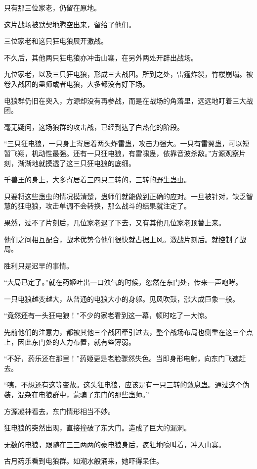 \begin{this_body}
只有那三位家老，仍留在原地。

这片战场被默契地腾空出来，留给了他们。

三位家老和这只狂电狼展开激战。

不久后，其他两只狂电狼亦冲击山寨，在另外两处开辟出战场。

九位家老，以及三只狂电狼，形成三大战团。所到之处，雷霆炸裂，竹楼崩塌。被卷入战团的蛊师或者电狼，大多都没有好下场。

电狼群仍旧在突入，方源却没有再参战，而是在战场的角落里，远远地盯着三大战团。

毫无疑问，这场狼群的攻击战，已经到达了白热化的阶段。

“三只狂电狼，一只身上寄居着两头炸雷蛊，攻击力强大。一只有雷翼蛊，可以短暂飞翔，机动性最强。还有一只狂电狼，有雷啸蛊，依靠音波杀敌。”方源观察片刻，渐渐地就摸透了这三只狂电狼的底细。

千兽王的身上，大多寄居着三四只二转的，三转的野生蛊虫。

只要将这些蛊虫的情况摸清楚，蛊师们就能做到正确的应对。一旦被针对，缺乏智慧的狂电狼，攻击单调不会转换，那么战斗的结果就注定了。

果然，过不了片刻后，几位家老退了下去，又有其他几位家老顶替上来。

他们之间相互配合，战术优势令他们很快就占据上风。激战片刻后。就控制了战局。

胜利只是迟早的事情。

“大局已定了。”就在药姬吐出一口浊气的时候，忽然在东门处，传来一声咆哮。

一只电狼越变越大，从普通的电狼大小的身躯。见风吹鼓，涨大成巨象一般。

“竟然还有一头狂电狼！”不少的家老看到这一幕，顿时吃了一大惊。

先前他们的注意力，都被其他三个战团牵引过去，整个战场布局也侧重在这三个点上，因此东门处的人力布置，就有些薄弱。

“不好，药乐还在那里！”药姬更是老脸骤然失色。当即身形电射，向东门飞速赶去。

“咦，不想还有这等变故。这头狂电狼，应该是有一只三转的敛息蛊。通过这个伪装，混杂在电狼群中，蒙骗了东门的那些蛊师。”

方源凝神看去，东门情形相当不妙。

狂电狼的突然出现，直接撞破了东大门。造成了巨大的漏洞。

无数的电狼，跟随在三三两两的豪电狼身后，疯狂地嚎叫着，冲入山寨。

古月药乐看到电狼群。如潮水般涌来，她吓得呆住。


\end{this_body}
